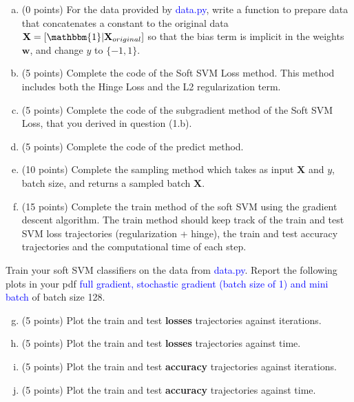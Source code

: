 \begin{enumerate}[(a)]
\item (0 points) For the data provided by \textcolor{blue}{data.py}, write a function to prepare data that concatenates a constant to the original data $\mathbf{X} =[\mathbbm{1}|\mathbf{X}_{original}]$ so that the bias term is implicit in the weights $\mathbf{w}$, and change $y$ to $\{-1, 1\}$.

\item (5 points) Complete the code of the Soft SVM Loss method. This method includes both the Hinge Loss and the L2 regularization term. %

\item (5 points) Complete the code of the subgradient method of the Soft SVM Loss, that you derived in question (1.b). %

\item (5 points) Complete the code of the predict method. %

\item (10 points) Complete the sampling method which takes as input $\mathbf{X}$ and $y$, batch size, and returns a sampled batch $\mathbf{X}$.

\item (15 points) Complete the train method of the soft SVM using the gradient descent algorithm. The train method should keep track of the train and test SVM loss trajectories (regularization + hinge), the train and test accuracy trajectories and the computational time of each step.

\end{enumerate}

Train your soft SVM classifiers on the data from \textcolor{blue}{data.py}.  Report the following plots in your pdf \textcolor{blue}{full gradient,  stochastic gradient (batch size of 1) and mini batch} of batch size 128.

\begin{enumerate}[(a)]\setcounter{enumi}{6}
\item (5 points) Plot the train and test \textbf{losses} trajectories against iterations.

\item (5 points) Plot the train and test \textbf{losses} trajectories against time.

\item (5 points) Plot the train and test \textbf{accuracy} trajectories against iterations.

\item (5 points) Plot the train and test \textbf{accuracy} trajectories against time.
\end{enumerate}
